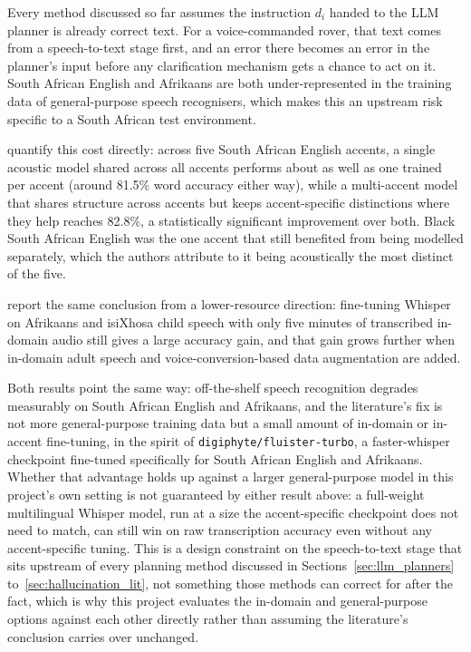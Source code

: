 
\label{sec:stt_lit}

Every method discussed so far assumes the instruction $d_i$ handed to the LLM planner is already
correct text. For a voice-commanded rover, that text comes from a speech-to-text stage first, and
an error there becomes an error in the planner's input before any clarification mechanism gets a
chance to act on it. South African English and Afrikaans are both under-represented in the
training data of general-purpose speech recognisers, which makes this an upstream risk specific to
a South African test environment.

\citet{kamper2012multiaccent} quantify this cost directly: across five South African English
accents, a single acoustic model shared across all accents performs about as well as one trained
per accent (around 81.5\% word accuracy either way), while a multi-accent model that shares
structure across accents but keeps accent-specific distinctions where they help reaches 82.8\%, a
statistically significant improvement over both. Black South African English was the one accent
that still benefited from being modelled separately, which the authors attribute to it being
acoustically the most distinct of the five.

\citet{jacobs2025afrikaans} report the same conclusion from a lower-resource direction:
fine-tuning Whisper on Afrikaans and isiXhosa child speech with only five minutes of transcribed
in-domain audio still gives a large accuracy gain, and that gain grows further when in-domain
adult speech and voice-conversion-based data augmentation are added.

Both results point the same way: off-the-shelf speech recognition degrades measurably on South
African English and Afrikaans, and the literature's fix is not more general-purpose training data
but a small amount of in-domain or in-accent fine-tuning, in the spirit of
\texttt{digiphyte/fluister-turbo}, a faster-whisper checkpoint fine-tuned specifically for South
African English and Afrikaans. Whether that advantage holds up against a larger general-purpose
model in this project's own setting is not guaranteed by either result above: a full-weight
multilingual Whisper model, run at a size the accent-specific checkpoint does not need to match,
can still win on raw transcription accuracy even without any accent-specific tuning. This is a
design constraint on the speech-to-text stage that sits upstream of every planning method
discussed in Sections~\ref{sec:llm_planners} to~\ref{sec:hallucination_lit}, not something those
methods can correct for after the fact, which is why this project evaluates the in-domain and
general-purpose options against each other directly rather than assuming the literature's
conclusion carries over unchanged.

